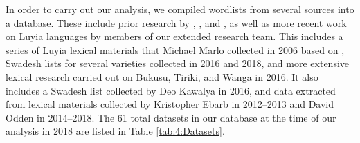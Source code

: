 \documentclass[output=paper]{langscibook}
\begin{document}
In order to carry out our analysis, we compiled wordlists from several sources into a database. These include prior research by \citet{brown_phonological_1972}, \citet{williams_lexico-statistical_1973}, and \citet{nurse_tanzania_1975}, as well as more recent work on Luyia languages by members of our extended research team. This includes a series of Luyia lexical materials that Michael Marlo collected in 2006 based on \citet{appleby_luluhya-english_1943}, Swadesh lists for several varieties collected in 2016 and 2018, and more extensive lexical research carried out on Bukusu, Tiriki, and Wanga in 2016. It also includes a Swadesh list collected by Deo Kawalya in 2016, and data extracted from lexical materials collected by Kristopher Ebarb in 2012–2013 and David Odden in 2014–2018. The 61 total datasets in our database at the time of our analysis in 2018 are listed in Table \ref{tab:4:Datasets}. 
\end{document}
